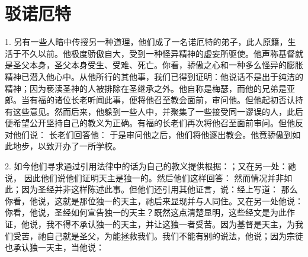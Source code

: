
\chapter{驳诺厄特}


1. 另有一些人暗中传授另一种道理，他们成了一名诺厄特的弟子，此人原籍，生活于不久以前。他极度骄傲自大，受到一种怪异精神的虚妄所驱使。他声称基督就是圣父本身，圣父本身受生、受难、死亡。你看，骄傲之心和一种多么怪异的膨胀精神已潜入他心中。从他所行的其他事，我们已得到证明：他说话不是出于纯洁的精神；因为亵渎圣神的人被排除在圣继承之外。他自称是梅瑟，而他的兄弟是亚郎。当有福的诸位长老听闻此事，便将他召至教会面前，审问他。但他起初否认持有这些意见。然而后来，他躲到一些人中，并聚集了一些接受同一谬误的人，此后便希望公开坚持自己的教义为正确。有福的长老们再次将他召至面前审问。但他反对他们说： 长老们回答他： 于是审问他之后，他们将他逐出教会。他竟骄傲到如此地步，以致开办了一所学校。\par

2. 如今他们寻求通过引用法律中的话为自己的教义提供根据：；又在另一处：祂说， 因此他们说他们证明天主是独一的。然后他们这样回答： 然而情况并非如此；因为圣经并非这样陈述此事。但他们还引用其他证言，说：经上写道： 那么你看，他说，这就是那位独一的天主，祂后来显现并与人同住。又在另一处他说： 你看，他说，圣经如何宣告独一的天主？既然这点清楚显明，这些经文是为此作证，他说，我不得不承认独一的天主，并让这独一者受苦。因为基督是天主，为我们受苦，祂自己就是圣父，为能拯救我们。我们不能有别的说法，他说；因为宗徒也承认独一天主，当他说：\par

